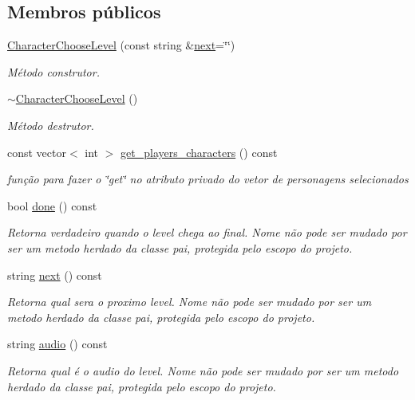 \subsection*{Membros públicos}
\begin{DoxyCompactItemize}
\item 
\mbox{\hyperlink{classCharacterChooseLevel_aa72c1238bc930fd230d13b89f75f5bb3}{Character\+Choose\+Level}} (const string \&\mbox{\hyperlink{classCharacterChooseLevel_a5ec053a025429ee6c11ef2aa5ec26218}{next}}=\char`\"{}\char`\"{})
\begin{DoxyCompactList}\small\item\em Método construtor. \end{DoxyCompactList}\item 
\mbox{\label{classCharacterChooseLevel_a3fc54e1f154609e75e117c00a9a6cbe8}} 
\mbox{\hyperlink{classCharacterChooseLevel_a3fc54e1f154609e75e117c00a9a6cbe8}{$\sim$\+Character\+Choose\+Level}} ()
\begin{DoxyCompactList}\small\item\em Método destrutor. \end{DoxyCompactList}\item 
const vector$<$ int $>$ \mbox{\hyperlink{classCharacterChooseLevel_a5746558bdd1785dd88ae2bf99a1ebc7d}{get\+\_\+players\+\_\+characters}} () const
\begin{DoxyCompactList}\small\item\em função para fazer o \char`\"{}get\char`\"{} no atributo privado do vetor de personagens selecionados \end{DoxyCompactList}\item 
bool \mbox{\hyperlink{classCharacterChooseLevel_a61050bcd8df73c5a1c941e2d3af6d384}{done}} () const
\begin{DoxyCompactList}\small\item\em Retorna verdadeiro quando o level chega ao final. Nome não pode ser mudado por ser um metodo herdado da classe pai, protegida pelo escopo do projeto. \end{DoxyCompactList}\item 
string \mbox{\hyperlink{classCharacterChooseLevel_a5ec053a025429ee6c11ef2aa5ec26218}{next}} () const
\begin{DoxyCompactList}\small\item\em Retorna qual sera o proximo level. Nome não pode ser mudado por ser um metodo herdado da classe pai, protegida pelo escopo do projeto. \end{DoxyCompactList}\item 
string \mbox{\hyperlink{classCharacterChooseLevel_ad46b1c34bad5001f45c0b386ad7fc8e1}{audio}} () const
\begin{DoxyCompactList}\small\item\em Retorna qual é o audio do level. Nome não pode ser mudado por ser um metodo herdado da classe pai, protegida pelo escopo do projeto. \end{DoxyCompactList}\end{DoxyCompactItemize}
